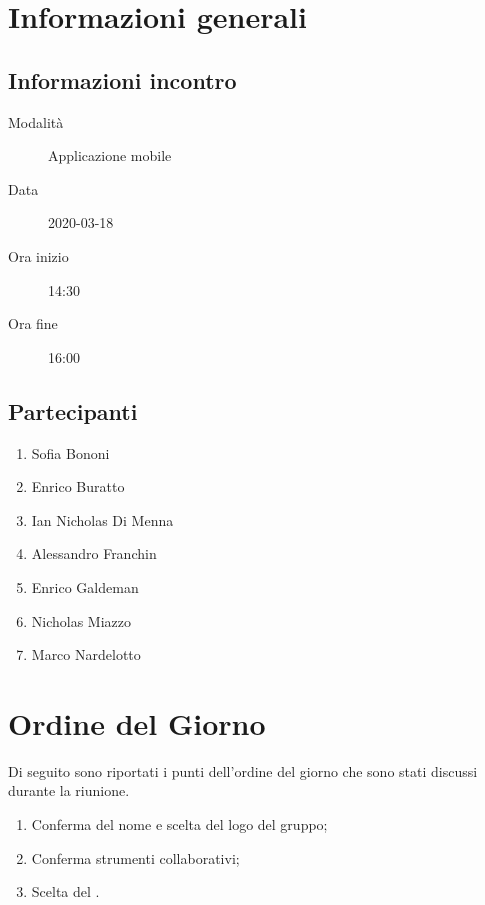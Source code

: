 \documentclass{article}
\begin{document}


\section{Informazioni generali}%
\label{sec:informazioni_generali}

\subsection{Informazioni incontro}%
\label{sub:informazioni_incontro}

\begin{description}
  \item[Modalità] Applicazione mobile 
  \item[Data] 2020-03-18
  \item[Ora inizio] 14:30
  \item[Ora fine] 16:00
\end{description}

\subsection{Partecipanti}%
\label{sub:partecipanti}

\begin{enumerate}
  \item Sofia Bononi
  \item Enrico Buratto
  \item Ian Nicholas Di Menna
  \item Alessandro Franchin
  \item Enrico Galdeman
  \item Nicholas Miazzo
  \item Marco Nardelotto
\end{enumerate}

\section{Ordine del Giorno}%
\label{ordine_del_giorno}
Di seguito sono riportati i punti dell'ordine del giorno che sono stati discussi durante la riunione.
\begin{enumerate}
  \item Conferma del nome e scelta del logo del gruppo;
  \item Conferma strumenti collaborativi;
  \item Scelta del .
\end{enumerate}
\end{document}
